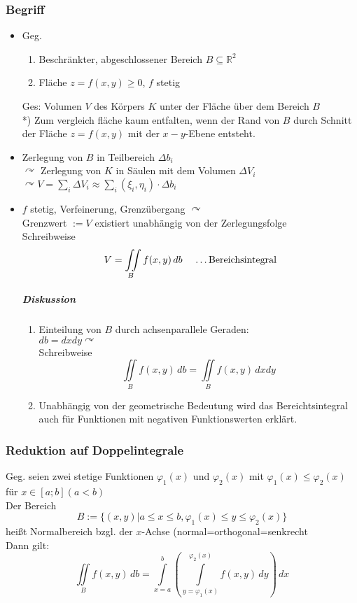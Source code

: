 \documentclass[a4paper]{scrartcl}
\begin{document}
\subsubsection{Begriff}
\begin{itemize}
\item Geg.
\begin{enumerate}
\item Beschränkter, abgeschlossener Bereich $B \subseteq \mathbb{R}^2$
\item Fläche $z=f(x,y) \geq 0$, $f$ stetig

\end{enumerate}
Ges: Volumen $V$ des Körpers $K$ unter der Fläche über dem Bereich $B$\\
*) Zum vergleich fläche kaum entfalten, wenn der Rand von $B$ durch Schnitt der Fläche $z=f(x,y)$ mit der $x-y$-Ebene entsteht.
\item Zerlegung von $B$ in Teilbereich $\Delta b_i$\\
$\curvearrowright$ Zerlegung von $K$ in Säulen mit dem Volumen $\Delta V_i$\\
$\curvearrowright V = \sum\limits_{i} \Delta V_i \approx \sum\limits_{i} (\xi_i,\eta_i) \cdot \Delta b_i$
\item $f$ stetig, Verfeinerung, Grenzübergang $\curvearrowright$\\
Grenzwert $:= V$ existiert unabhängig von der Zerlegungsfolge\\
Schreibweise \[V= \iint\limits_{B} f(x,y) \, db \quad \text{ \dots Bereichsintegral} \]
\subparagraph{Diskussion}
\begin{enumerate}
\item Einteilung von $B$ durch achsenparallele Geraden:\\
$db = dxdy \curvearrowright$\\
Schreibweise \[ \iint\limits_{B} f(x,y) \, db = \iint\limits_{B} f(x,y) \, dxdy \]
\item Unabhängig von der geometrische Bedeutung wird das Bereichtsintegral auch für Funktionen mit negativen Funktionswerten erklärt.
\end{enumerate}
\end{itemize}

\subsubsection{Reduktion auf Doppelintegrale}
Geg. seien zwei stetige Funktionen $\varphi_1 (x)$ und $\varphi_2 (x)$ mit $\varphi_1 (x) \leq \varphi_2 (x)$ für $x \in [a;b] (a<b)$\\
Der Bereich \[B := \{ (x,y) | a \leq x \leq b, \varphi_1 (x) \leq y \leq \varphi_2 (x) \} \] heißt Normalbereich bzgl. der $x$-Achse (normal=orthogonal=senkrecht\\
Dann gilt: \[ \iint\limits_{B} f(x,y) \, db = \int\limits_{x=a}^b \left ( \int\limits_{y=\varphi_1 (x)}^{\varphi_2 (x)} f(x,y) \, dy \right ) \, dx \]
\end{document}

